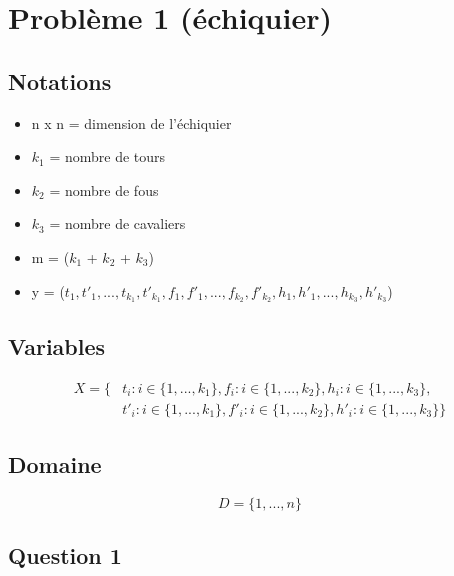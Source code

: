 \documentclass[a4paper,11pt]{article}
\begin{document}
\section{Problème 1 (échiquier)}
\subsection{Notations}
\begin{itemize}
\item n x n = dimension de l'échiquier
\item $k_{1}$ = nombre de tours
\item $k_{2}$ = nombre de fous
\item $k_{3}$ = nombre de cavaliers

\item m = ($k_{1}$ + $k_{2}$ + $k_{3}$)
\item y = ($t_{1}, t'_{1}, ..., t_{k_{1}}, t'_{k_{1}}, f_{1}, f'_{1}, ..., f_{k_{2}}, f'_{k_{2}}, h_{1}, h'_{1}, ..., h_{k_{3}}, h'_{k_{3}}$)
\end{itemize}

\subsection{Variables}
\begin{equation}
  \begin{split}
    X = \{ &t_{i} : i \in  \{1, ..., k_{1} \}, f_{i} : i \in  \{1, ..., k_{2} \}, h_{i} : i \in  \{1, ..., k_{3} \}, \\
    &t'_{i} : i \in  \{1, ..., k_{1} \}, f'_{i} : i \in  \{1, ..., k_{2} \}, h'_{i} : i \in  \{1, ..., k_{3} \} \}
  \end{split}
\end{equation}

\subsection{Domaine}
$$D = \{1, ..., n \}$$

\subsection{Question 1}
\end{document}

